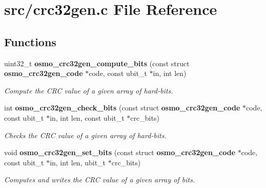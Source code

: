 \section{src/crc32gen.c File Reference}
\label{crc32gen_8c}
\subsection*{Functions}
\begin{DoxyCompactItemize}
\item 
uint32\+\_\+t \textbf{ osmo\+\_\+crc32gen\+\_\+compute\+\_\+bits} (const struct \textbf{ osmo\+\_\+crc32gen\+\_\+code} $\ast$code, const ubit\+\_\+t $\ast$in, int len)
\begin{DoxyCompactList}\small\item\em Compute the C\+RC value of a given array of hard-\/bits. \end{DoxyCompactList}\item 
int \textbf{ osmo\+\_\+crc32gen\+\_\+check\+\_\+bits} (const struct \textbf{ osmo\+\_\+crc32gen\+\_\+code} $\ast$code, const ubit\+\_\+t $\ast$in, int len, const ubit\+\_\+t $\ast$crc\+\_\+bits)
\begin{DoxyCompactList}\small\item\em Checks the C\+RC value of a given array of hard-\/bits. \end{DoxyCompactList}\item 
void \textbf{ osmo\+\_\+crc32gen\+\_\+set\+\_\+bits} (const struct \textbf{ osmo\+\_\+crc32gen\+\_\+code} $\ast$code, const ubit\+\_\+t $\ast$in, int len, ubit\+\_\+t $\ast$crc\+\_\+bits)
\begin{DoxyCompactList}\small\item\em Computes and writes the C\+RC value of a given array of bits. \end{DoxyCompactList}\end{DoxyCompactItemize}

